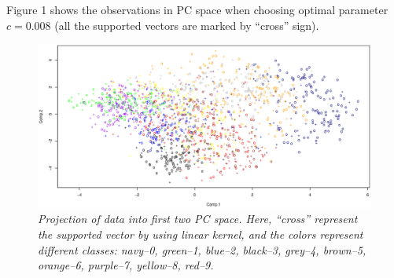 \documentclass{article}
\begin{document}

Figure 1 shows the observations in PC space when choosing optimal parameter $c=0.008$ (all the supported vectors are marked by ``cross'' sign).

\begin{figure}[htp]
\centering
\includegraphics[width=12.1cm]{large_svm_linear.eps}
\caption{\textit{Projection of data into first two PC space. Here, ``cross'' represent the supported vector by using linear kernel, and the colors represent different classes: navy--0, green--1, blue--2, black--3, grey--4, brown--5, orange--6, purple--7, yellow--8, red--9.}}
\end{figure}
\end{document}
